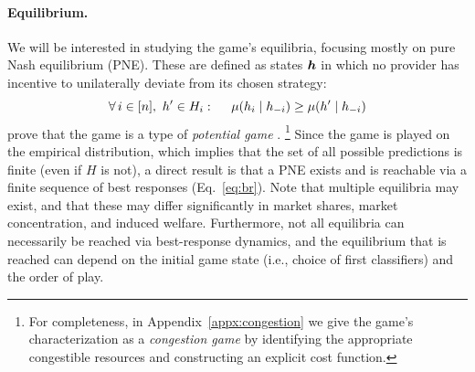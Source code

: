 

\paragraph{Equilibrium.}
We will be interested in studying the game's equilibria,
focusing mostly on pure Nash equilibrium (PNE).
These are defined as states ${\bm{h}}$ in which no provider has incentive to unilaterally deviate from its chosen strategy:
\squeeze
\begin{equation}
\label{eq:pne}
\forall \, i\in [n], \,\, h' \in H_i: \quad\,\,
\ms(h_i \mid h_{-i}) \ge \ms(h' \mid h_{-i}) %
\end{equation}
\citet{ben2017best} prove that the game is a type of \emph{potential game} \citep{monderer1996potential}.%
\footnote{For completeness, in Appendix~\ref{appx:congestion}
we give the game's characterization as a \emph{congestion game} by identifying the appropriate congestible resources and constructing an explicit cost function.}
Since the game is played on the empirical distribution,
which implies that the set of all possible predictions is finite (even if $H$ is not),
a direct result is that a PNE exists
and is reachable via a finite sequence of best responses (Eq.~\eqref{eq:br}).
Note that multiple equilibria may exist, and that these may differ significantly
in market shares, market concentration, and induced welfare.
Furthermore, not all equilibria can necessarily be reached via best-response dynamics,
and the equilibrium that is reached can depend on the initial game state (i.e., choice of first classifiers) and the order of play.




